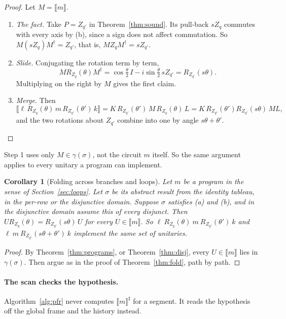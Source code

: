 \documentclass[11pt]{article}
\newtheorem{corollary}[theorem]{Corollary}
\theoremstyle{definition}
\theoremstyle{remark}
\newcommand{\sem}[1]{\llbracket #1 \rrbracket}
\newcommand{\abs}[1]{\llbracket #1 \rrbracket^{\sharp}}
\newcommand{\adj}{^{\dagger}}
\newcommand{\gam}{\gamma}
\begin{document}
\begin{proof}
Let $M = \sem{m}$.
\begin{enumerate}[nosep]
  \item \emph{The fact.} Take $P = Z_{q'}$ in Theorem~\ref{thm:sound}. Its pull-back $s Z_q$
  commutes with every axis by (b), since a sign does not affect commutation. So
  $M (s Z_q) M\adj = Z_{q'}$, that is, $M Z_q M\adj = s Z_{q'}$.
  \item \emph{Slide.} Conjugating the rotation term by term,
  \[
    M R_{Z_q}(\theta) M\adj
    = \cos\tfrac{\theta}{2}\, I - i \sin\tfrac{\theta}{2}\, s Z_{q'}
    = R_{Z_{q'}}(s\theta) .
  \]
  Multiplying on the right by $M$ gives the first claim.
  \item \emph{Merge.} Then
  \[
    \sem{\ell\, R_{Z_q}(\theta)\, m\, R_{Z_{q'}}(\theta')\, k}
    = K\, R_{Z_{q'}}(\theta')\, M\, R_{Z_q}(\theta)\, L
    = K\, R_{Z_{q'}}(\theta') R_{Z_{q'}}(s\theta)\, M L ,
  \]
  and the two rotations about $Z_{q'}$ combine into one by angle $s\theta + \theta'$.
  \qedhere
\end{enumerate}
\end{proof}

Step 1 uses only $M \in \gam(\sigma)$, not the circuit $m$ itself. So the same argument
applies to every unitary a program can implement.

\begin{corollary}[Folding across branches and loops]\label{cor:fold-programs}
Let $m$ be a program in the sense of Section~\ref{sec:loops}. Let $\sigma$ be its abstract
result from the identity tableau, in the per-row or the disjunctive domain. Suppose $\sigma$
satisfies (a) and (b), and in the disjunctive domain assume this of every disjunct. Then
$U R_{Z_q}(\theta) = R_{Z_{q'}}(s\theta)\, U$ for every $U \in \sem{m}$. So
$\ell\ R_{Z_q}(\theta)\ m\ R_{Z_{q'}}(\theta')\ k$ and
$\ell\ m\ R_{Z_{q'}}(s\theta+\theta')\ k$ implement the same set of unitaries.
\end{corollary}

\begin{proof}
By Theorem~\ref{thm:programs}, or Theorem~\ref{thm:disj}, every $U \in \sem{m}$ lies in
$\gam(\sigma)$. Then argue as in the proof of Theorem~\ref{thm:fold}, path by path.
\end{proof}

\paragraph{The scan checks the hypothesis.}
Algorithm~\ref{alg:pfr} never computes $\abs{m}$ for a segment. It reads the hypothesis off
the global frame and the history instead.
\end{document}
